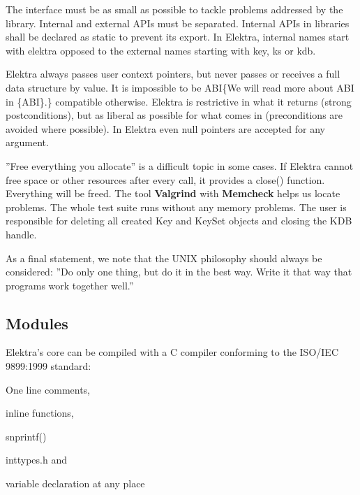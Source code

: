 The interface must be as small as possible to tackle problems addressed by the library. Internal and external A\+P\+Is must be separated. Internal A\+P\+Is in libraries shall be declared as {\ttfamily static} to prevent its export. In Elektra, internal names start with {\ttfamily elektra} opposed to the external names starting with {\ttfamily key}, {\ttfamily ks} or {\ttfamily kdb}.

Elektra always passes user context pointers, but never passes or receives a full data structure by value. It is impossible to be A\+B\+I\{We will read more about A\+B\+I in \{A\+B\+I\}.\} compatible otherwise. Elektra is restrictive in what it returns (strong postconditions), but as liberal as possible for what comes in (preconditions are avoided where possible). In Elektra even null pointers are accepted for any argument.

''Free everything you allocate'' is a difficult topic in some cases. If Elektra cannot free space or other resources after every call, it provides a {\ttfamily close()} function. Everything will be freed. The tool {\bfseries Valgrind} with {\bfseries Memcheck} helps us locate problems. The whole test suite runs without any memory problems. The user is responsible for deleting all created {\ttfamily Key} and {\ttfamily Key\+Set} objects and closing the {\ttfamily K\+D\+B} handle.

As a final statement, we note that the U\+N\+I\+X philosophy should always be considered\+: ''Do only one thing, but do it in the best way. Write it that way that programs work together well.''

\subsection*{Modules}

Elektra's core can be compiled with a C compiler conforming to the I\+S\+O/\+I\+E\+C 9899\+:1999 standard\+:


\begin{DoxyItemize}
\item One line comments,
\item inline functions,
\item {\ttfamily snprintf()}
\item inttypes.\+h and
\item variable declaration at any place
\end{DoxyItemize}

